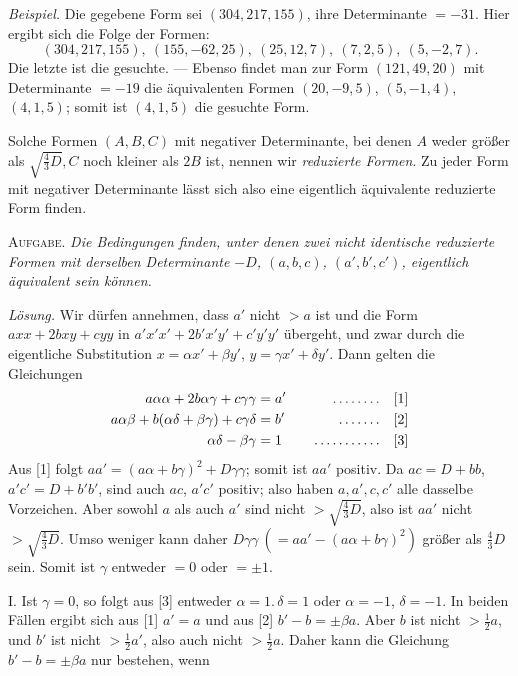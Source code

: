 \emph{Beispiel.} Die gegebene Form sei $(304,217,155)$, ihre Determinante $=-31$. Hier ergibt sich die Folge der Formen:
\[
(304,217,155),\ (155,-62,25),\ (25,12,7),\ (7,2,5),\ (5,-2,7).
\]
Die letzte ist die gesuchte. --- Ebenso findet man zur Form $(121,49,20)$ mit Determinante $=-19$ die äquivalenten Formen $(20,-9,5)$, $(5,-1,4)$, $(4,1,5)$; somit ist $(4,1,5)$ die gesuchte Form.

Solche Formen $(A,B,C)$ mit negativer Determinante, bei denen $A$ weder größer als $\surd{\frac43 D},C$ noch kleiner als $2B$ ist, nennen wir \emph{reduzierte Formen}. Zu jeder Form mit negativer Determinante lässt sich also eine eigentlich äquivalente reduzierte Form finden.

\textsc{Aufgabe.} \emph{Die Bedingungen finden, unter denen zwei nicht identische reduzierte Formen mit derselben Determinante $-D$, $(a,b,c)$, $(a',b',c')$, eigentlich äquivalent sein können.}

\emph{Lösung.} Wir dürfen annehmen, dass $a'$ nicht $>a$ ist und die Form $axx+2bxy+cyy$ in $a'x'x'+2b'x'y'+c'y'y'$ übergeht, und zwar durch die eigentliche Substitution $x=\alpha x'+\beta y'$, $y=\gamma x'+\delta y'$. Dann gelten die Gleichungen
\[
\begin{aligned}
a\alpha\alpha+2b\alpha\gamma+c\gamma\gamma&=a'&\quad\mathinner{.\,.\,.\,.\,.\,.\,.\,.}\quad&[1]\\
a\alpha\beta+b(\alpha\delta+\beta\gamma)+c\gamma\delta&=b'&\quad\mathinner{.\,.\,.\,.\,.\,.\,.}\quad&[2]\\
\alpha\delta-\beta\gamma&=1&\quad\mathinner{.\,.\,.\,.\,.\,.\,.\,.\,.\,.\,.}\quad&[3]
\end{aligned}
\]
Aus [1] folgt $aa'=(a\alpha+b\gamma)^2+D\gamma\gamma$; somit ist $aa'$ positiv. Da $ac=D+bb$, $a'c'=D+b'b'$, sind auch $ac$, $a'c'$ positiv; also haben $a,a',c,c'$ alle dasselbe Vorzeichen. Aber sowohl $a$ als auch $a'$ sind nicht $>\surd{\frac43 D}$, also ist $aa'$ nicht $>\surd{\frac43 D}$. Umso weniger kann daher $D\gamma\gamma\ (=aa'-(a\alpha+b\gamma)^2)$ größer als $\frac43 D$ sein. Somit ist $\gamma$ entweder $=0$ oder $=\pm1$.

I. Ist $\gamma=0$, so folgt aus [3] entweder $\alpha=1.\,\delta=1$ oder $\alpha=-1$, $\delta=-1$.
In beiden Fällen ergibt sich aus [1] $a'=a$ und aus [2] $b'-b=\pm\beta a$. Aber $b$ ist nicht $>\frac12 a$, und $b'$ ist nicht $>\frac12 a'$, also auch nicht $>\frac12 a$. Daher kann die Gleichung $b'-b=\pm\beta a$ nur bestehen, wenn

